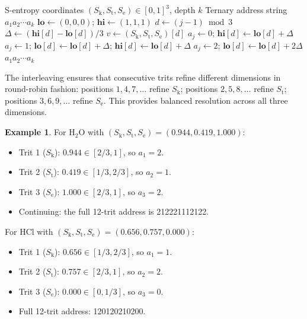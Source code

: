 \documentclass[11pt,twocolumn,a4paper]{article}
\theoremstyle{definition}
\newtheorem{example}[theorem]{Example}
\theoremstyle{remark}
\newcommand{\Sk}{S_{\mathrm{k}}}
\newcommand{\St}{S_{\mathrm{t}}}
\newcommand{\Se}{S_{\mathrm{e}}}
\begin{document}
\begin{algorithm}[H]
\caption{Interleaved Ternary Address Computation}
\label{alg:interleaved}
\begin{algorithmic}[1]
\REQUIRE S-entropy coordinates $(\Sk, \St, \Se) \in [0,1]^3$, depth $k$
\ENSURE Ternary address string $a_1 a_2 \cdots a_k$
\STATE $\mathbf{lo} \leftarrow (0, 0, 0)$; $\mathbf{hi} \leftarrow (1, 1, 1)$
  \STATE $d \leftarrow (j-1) \bmod 3$ \COMMENT{dimension: 0=$\Sk$, 1=$\St$, 2=$\Se$}
  \STATE $\Delta \leftarrow (\mathbf{hi}[d] - \mathbf{lo}[d])/3$
  \STATE $v \leftarrow (\Sk, \St, \Se)[d]$
    \STATE $a_j \leftarrow 0$; $\mathbf{hi}[d] \leftarrow \mathbf{lo}[d] + \Delta$
    \STATE $a_j \leftarrow 1$; $\mathbf{lo}[d] \leftarrow \mathbf{lo}[d] + \Delta$; $\mathbf{hi}[d] \leftarrow \mathbf{lo}[d] + \Delta$
  \ELSE
    \STATE $a_j \leftarrow 2$; $\mathbf{lo}[d] \leftarrow \mathbf{lo}[d] + 2\Delta$
  \ENDIF
\ENDFOR
\RETURN $a_1 a_2 \cdots a_k$
\end{algorithmic}
\end{algorithm}

The interleaving ensures that consecutive trits refine different dimensions in round-robin fashion: positions $1, 4, 7, \ldots$ refine $\Sk$; positions $2, 5, 8, \ldots$ refine $\St$; positions $3, 6, 9, \ldots$ refine $\Se$. This provides balanced resolution across all three dimensions.

\begin{example}
For H$_2$O with $(\Sk, \St, \Se) = (0.944, 0.419, 1.000)$:
\begin{itemize}
  \item Trit 1 ($\Sk$): $0.944 \in [2/3, 1]$, so $a_1 = 2$.
  \item Trit 2 ($\St$): $0.419 \in [1/3, 2/3]$, so $a_2 = 1$.
  \item Trit 3 ($\Se$): $1.000 \in [2/3, 1]$, so $a_3 = 2$.
  \item Continuing: the full 12-trit address is 212221112122.
\end{itemize}
For HCl with $(\Sk, \St, \Se) = (0.656, 0.757, 0.000)$:
\begin{itemize}
  \item Trit 1 ($\Sk$): $0.656 \in [1/3, 2/3]$, so $a_1 = 1$.
  \item Trit 2 ($\St$): $0.757 \in [2/3, 1]$, so $a_2 = 2$.
  \item Trit 3 ($\Se$): $0.000 \in [0, 1/3]$, so $a_3 = 0$.
  \item Full 12-trit address: 120120210200.
\end{itemize}
\end{example}
\end{document}
